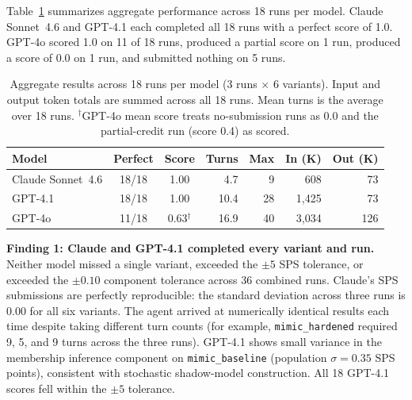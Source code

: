 \documentclass[11pt]{article}
\begin{document}
Table~\ref{tab:aggregate} summarizes aggregate performance across 18 runs
per model. Claude Sonnet~4.6 and GPT-4.1 each completed all 18 runs with a
perfect score of 1.0. GPT-4o scored 1.0 on 11 of 18 runs, produced a
partial score on 1 run, produced a score of 0.0 on 1 run, and submitted
nothing on 5 runs.

\begin{table}[t]
\caption{Aggregate results across 18 runs per model (3 runs $\times$ 6
variants). Input and output token totals are summed across all 18 runs.
Mean turns is the average over 18 runs. $^\dagger$GPT-4o mean score treats
no-submission runs as 0.0 and the partial-credit run (score 0.4) as scored.}
\label{tab:aggregate}
\vskip 0.1in
\centering
\small
\begin{tabular}{@{}lccrrrr@{}}
\toprule
\textbf{Model} & \textbf{Perfect} & \textbf{Score}
  & \textbf{Turns} & \textbf{Max}
  & \textbf{In (K)} & \textbf{Out (K)} \\
\midrule
Claude Sonnet~4.6 & 18/18 & 1.00  & 4.7  &  9 & 608 & 73 \\
GPT-4.1           & 18/18 & 1.00  & 10.4 & 28 & 1{,}425 & 73 \\
GPT-4o            & 11/18 & 0.63$^\dagger$ & 16.9 & 40 & 3{,}034 & 126 \\
\bottomrule
\end{tabular}
\end{table}

\textbf{Finding 1: Claude and GPT-4.1 completed every variant and run.}
Neither model missed a single variant, exceeded the $\pm 5$ SPS tolerance,
or exceeded the $\pm 0.10$ component tolerance across 36 combined runs.
Claude's SPS submissions are perfectly reproducible: the standard deviation
across three runs is 0.00 for all six variants. The agent arrived at
numerically identical results each time despite taking different turn counts
(for example, \texttt{mimic\_hardened} required 9, 5, and 9 turns across the
three runs). GPT-4.1 shows small variance in the membership inference
component on \texttt{mimic\_baseline} (population $\sigma = 0.35$ SPS
points), consistent with stochastic shadow-model construction. All 18 GPT-4.1
scores fell within the $\pm 5$ tolerance.
\end{document}
